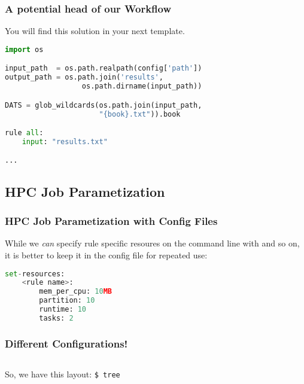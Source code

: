 \begin{frame}[fragile]
  \frametitle{A potential head of our Workflow}
  You will find this solution in your next template.
  \begin{lstlisting}[language=Python,style=Python, basicstyle=\small]
import os

input_path  = os.path.realpath(config['path'])
output_path = os.path.join('results', 
                  os.path.dirname(input_path))

DATS = glob_wildcards(os.path.join(input_path, 
                      "{book}.txt")).book

rule all:
    input: "results.txt"

...
  \end{lstlisting}
\end{frame}

\subsection{HPC Job Parametization}

\begin{frame}[fragile]
  \frametitle{HPC Job Parametization with Config Files}
  While we \emph{can} specify rule specific resoures on the command line with  and so on, it is better to keep it in the config file for repeated use:
  \begin{lstlisting}[language=Python,style=Python]
set-resources:
    <rule name>:
        mem_per_cpu: 10MB
        partition: 10
        runtime: 10
        tasks: 2
  \end{lstlisting}
\end{frame}

\begin{frame}
  \frametitle{Different Configurations!}
  \begin{columns}
    \begin{column}{0.5\textwidth}
        So, we have this layout:
              {\tiny \DTsetlength{0.2em}{1em}{0.2em}{0.4pt}{.6pt}
\texttt{\$ tree}
}
    \end{column}
    \begin{column}{0.5\textwidth}
      \pause
    \end{column}
  \end{columns}
\end{frame}

